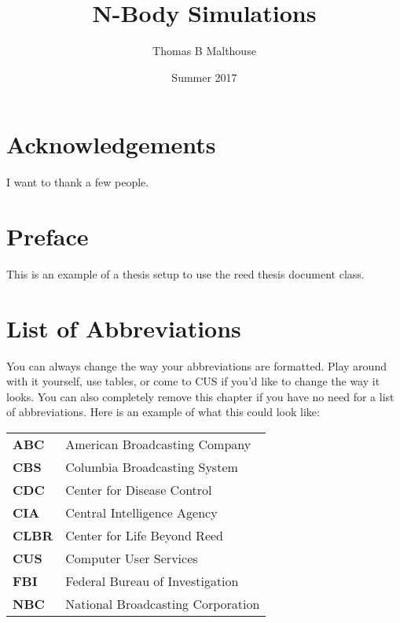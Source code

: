 \documentclass[12pt,twoside]{reedthesis}
\title{N-Body Simulations}
\author{Thomas B Malthouse}
\date{Summer 2017}
\begin{document}
  \maketitle
  \frontmatter %
  \pagestyle{empty} %

    \chapter*{Acknowledgements}
	I want to thank a few people.

    \chapter*{Preface}
	This is an example of a thesis setup to use the reed thesis document class.



    \chapter*{List of Abbreviations}
		You can always change the way your abbreviations are formatted. Play around with it yourself, use tables, or come to CUS if you'd like to change the way it looks. You can also completely remove this chapter if you have no need for a list of abbreviations. Here is an example of what this could look like:

	\begin{table}[h]
	\centering %
	\begin{tabular}{ll}
		\textbf{ABC}  	&  American Broadcasting Company \\
		\textbf{CBS}  	&  Columbia Broadcasting System\\
		\textbf{CDC}  	&  Center for Disease Control \\
		\textbf{CIA}  	&  Central Intelligence Agency\\
		\textbf{CLBR} 	&  Center for Life Beyond Reed\\
		\textbf{CUS}  	&  Computer User Services\\
		\textbf{FBI}  	&  Federal Bureau of Investigation\\
		\textbf{NBC}  	&  National Broadcasting Corporation\\
	\end{tabular}
	\end{table}
\end{document}
